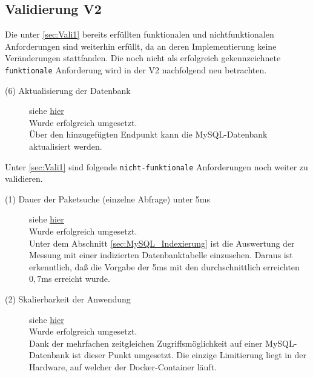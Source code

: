 \subsection{Validierung V2} \label{sec:Vali2}
    Die unter \ref{sec:Vali1}  bereits erfüllten funktionalen und nichtfunktionalen Anforderungen sind weiterhin erfüllt, da an deren Implementierung keine Veränderungen stattfanden.
    Die noch nicht als erfolgreich gekennzeichnete \texttt{funktionale} Anforderung wird in der V2 nachfolgend neu betrachten.

    \begin{description}
        \item[(6) Aktualisierung der Datenbank] siehe \hyperref[f:six]{\underline{hier}} \hfill \\
            Wurde erfolgreich umgesetzt.
            \\
            Über den hinzugefügten Endpunkt kann die MySQL-Datenbank aktualisiert werden.
    \end{description}

    \noindent Unter \ref{sec:Vali1}  sind folgende \texttt{nicht-funktionale} Anforderungen noch weiter zu validieren.

    \begin{description}
        \item[(1) Dauer der Paketsuche (einzelne Abfrage) unter 5ms] siehe \hyperref[nf:one]{\underline{hier}} \hfill \\
            Wurde erfolgreich umgesetzt.
            \\
            Unter dem Abschnitt \ref{sec:MySQL_Indexierung} ist die Auswertung der Messung mit einer indizierten Datenbanktabelle einzusehen.
            Daraus ist erkenntlich, daß die Vorgabe der 5ms mit den durchschnittlich erreichten $0,7$ms erreicht wurde.
        \item[(2) Skalierbarkeit der Anwendung] siehe \hyperref[nf:two]{\underline{hier}} \hfill \\
            Wurde erfolgreich umgesetzt.
            \\
            Dank der mehrfachen zeitgleichen Zugriffsmöglichkeit auf einer MySQL-Datenbank ist dieser Punkt umgesetzt.
            Die einzige Limitierung liegt in der Hardware, auf welcher der Docker-Container läuft.
    \end{description}
